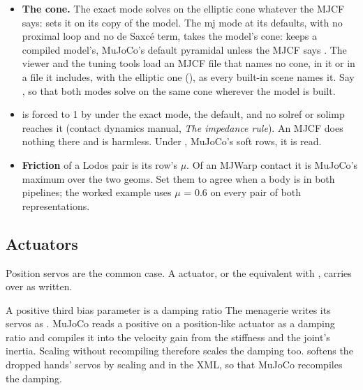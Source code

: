 \begin{itemize}
\item \textbf{The cone.} The exact mode solves on the elliptic cone whatever the MJCF says:  sets it on its copy of the model. The mj mode at its defaults, with no proximal loop and no de Saxc\'e term, takes the model's cone:  keeps a compiled model's, MuJoCo's default pyramidal unless the MJCF says . The viewer and the tuning tools load an MJCF file that names no cone, in it or in a file it includes, with the elliptic one (), as every built-in scene names it. Say , so that both modes solve on the same cone wherever the model is built.
\item \textbf{} is forced to 1 by  under the exact mode, the default, and no solref or solimp reaches it (contact dynamics manual, \emph{The impedance rule}). An MJCF  does nothing there and is harmless. Under , MuJoCo's soft rows, it is read.
\item \textbf{Friction} of a Lodos pair is its row's $\mu$. Of an MJWarp contact it is MuJoCo's maximum over the two geoms. Set them to agree when a body is in both pipelines; the worked example uses $\mu$ = 0.6 on every pair of both representations.
\end{itemize}

\subsection{Actuators}\label{sec:actuators}

Position servos are the common case. A  actuator, or the equivalent  with , carries over as written.

\begin{notebox}{A positive third bias parameter is a damping ratio}
The menagerie writes its servos as . MuJoCo reads a positive  on a position-like actuator as a damping ratio and compiles it into the velocity gain from the stiffness and the joint's inertia. Scaling  without recompiling therefore scales the damping too.  softens the dropped hands' servos by scaling  and  in the XML, so that MuJoCo recompiles the damping.
\end{notebox}

